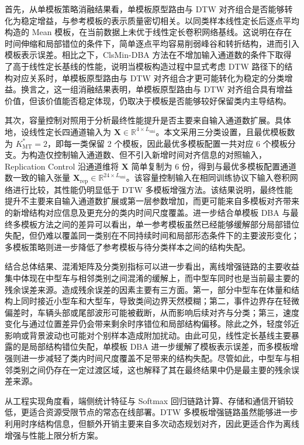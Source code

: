 \documentclass{xdupgthesis}
\begin{document}
首先，从单模板策略消融结果看，单模板原型路由与 DTW 对齐组合是否能够转化为稳定增益，与参考模板的表示质量密切相关。以同类样本线性定长后逐点平均构造的 Mean 模板，在当前数据上未优于线性定长卷积网络基线。这说明在存在时间伸缩和局部错位的条件下，简单逐点平均容易削弱峰谷和转折结构，进而引入模板表示误差。相比之下，ClsMin-DBA 方法在不增加输入通道数的条件下取得了高于线性定长基线的性能，说明当模板构造过程中显式考虑 DTW 路径下的结构对应关系时，单模板原型路由与 DTW 对齐组合才更可能转化为稳定的分类增益。换言之，这一组消融结果表明，单模板原型路由与 DTW 对齐组合具有增益价值，但该价值能否稳定体现，仍取决于模板是否能够较好保留类内主导结构。

其次，容量控制对照用于分析最终性能提升是否主要来自输入通道数扩展。具体地，设线性定长四通道输入为 $\mathbf{X}\in\mathbb{R}^{4\times L_{\mathrm{uni}}}$。本文采用三分类设置，且最优模板数为 $K_{\mathrm{MT}}^\ast=2$，即每一类保留 2 个模板，因此最优多模板配置一共对应 6 个模板分支。为构造仅控制输入通道数、但不引入新增时间对齐信息的对照输入，Replication Control 沿通道维将 $\mathbf{X}$ 简单复制为 6 份，得到与最优多模板配置通道数一致的输入张量 $\mathbf{X}_{\mathrm{rep}}\in\mathbb{R}^{24\times L_{\mathrm{uni}}}$。该容量控制输入在相同训练协议下输入卷积网络进行比较，其性能仍明显低于 DTW 多模板增强方法。该结果说明，最终性能提升不主要来自输入通道数扩展或第一层参数增加，而更可能来自多模板对齐带来的新增结构对应信息及更充分的类内时间尺度覆盖。进一步结合单模板 DBA 与最终多模板方法之间的差异可以看出，单一参考模板虽然已经能够缓解部分局部错位失配，但仍难以覆盖同一类别在不同持续时间和局部形态条件下的主要波形变化；多模板策略则进一步降低了参考模板与待分类样本之间的结构失配。

结合总体结果、混淆矩阵及分类别指标可以进一步看出，离线增强链路的主要收益集中体现在中型车与相邻类别之间混淆的缓解上，而中型车同时也是当前最主要的残余误差来源。造成残余误差的因素主要有三方面。第一，部分中型车在体量和结构上同时接近小型车和大型车，导致类间边界天然模糊；第二，事件边界存在轻微偏差时，车辆头部或尾部波形可能被截断，从而影响后续对齐与分类；第三，速度变化与通过位置差异仍会带来剩余时序错位和局部结构偏移。除此之外，轻度邻近影响或背景波动也可能对个别样本造成附加扰动。由此可见，线性定长基线主要暴露的是局部结构错位失配，单模板 DBA 进一步缓解了模板表示误差，而多模板增强则进一步减轻了类内时间尺度覆盖不足带来的结构失配。尽管如此，中型车与相邻类别之间仍存在一定过渡区域，这也解释了其在最终结果中仍是最主要的残余误差来源。

从工程实现角度看，端侧统计特征与 Softmax 回归链路计算、存储和通信开销较低，更适合资源受限节点的常态在线部署。DTW 多模板增强链路虽然能够进一步利用时序结构信息，但额外开销主要来自多次动态规划对齐，因此更适合作为离线增强与性能上限分析方案。
\end{document}
